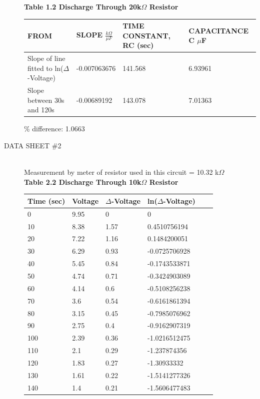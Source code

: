 \documentclass{article}
\begin{document}
\begin{description}
\begin{samepage}
{{\begin{center}
\begin{tabular}{| l | l | l | l | l | l | }
	\end{tabular}
\end{center}
}}
\end{samepage}
\textbf{Table 1.2 Discharge Through 20k$\Omega$ Resistor } \
{\small{
\begin{center}
	\begin{tabular}{| l | l | l | l |}
	\hline
FROM&SLOPE $\frac{k\Omega}{\mu F}$& TIME CONSTANT, RC (sec)&CAPACITANCE C $\mu$F \\ \hline
Slope of line fitted to ln($\Delta$-Voltage)  &-0.007063676&141.568&6.93961\\ \hline
Slope between 30s and 120s&-0.00689192&143.078&7.01363\\ \hline
	\end{tabular}
\end{center}
\% difference: 1.0663 \\
}}

\item[DATA SHEET \#2] \hfill \\
Measurement by meter of resistor used in this circuit = 10.32 k$\Omega$ \\
\textbf{Table 2.2 Discharge Through 10k$\Omega$ Resistor } \
{\small{
\begin{center}
	\begin{tabular}{| l | l | l | l | l | l | }
	\hline
Time (sec) & Voltage &  $\Delta$-Voltage & ln($\Delta$-Voltage) \\ \hline
0	&	9.95	&	0	&	0	\\	\hline
10	&	8.38	&	1.57	&	0.4510756194	\\	\hline
20	&	7.22	&	1.16	&	0.1484200051	\\	\hline
30	&	6.29	&	0.93	&	-0.0725706928	\\	\hline
40	&	5.45	&	0.84	&	-0.1743533871	\\	\hline
50	&	4.74	&	0.71	&	-0.3424903089	\\	\hline
60	&	4.14	&	0.6	&	-0.5108256238	\\	\hline
70	&	3.6	&	0.54	&	-0.6161861394	\\	\hline
80	&	3.15	&	0.45	&	-0.7985076962	\\	\hline
90	&	2.75	&	0.4	&	-0.9162907319	\\	\hline
100	&	2.39	&	0.36	&	-1.0216512475	\\	\hline
110	&	2.1	&	0.29	&	-1.237874356	\\	\hline
120	&	1.83	&	0.27	&	-1.30933332	\\	\hline
130	&	1.61	&	0.22	&	-1.5141277326	\\	\hline
140	&	1.4	&	0.21	&	-1.5606477483	\\	\hline


\end{tabular}
\end{center}}}
\end{description}
\end{document}
